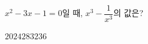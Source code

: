 $x^2-3x-1=0$일 때, $x^3-\dfrac{1}{x^3}$의 값은?
\begin{choices32}{$20$}{$24$}{$28$}{$32$}{$36$}\end{choices32}

